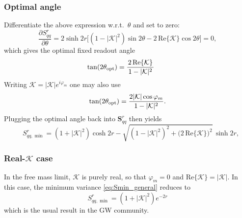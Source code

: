 \subsubsection*{Optimal angle}
Differentiate the above expression w.r.t.~\(\theta\) and set to zero:
\[
\frac{\partial S^{r}_{qq}}{\partial \theta}
= 2\sinh 2r\Big[(1-|\mathcal{K}|^{2})\sin 2\theta - 2\,\mathrm{Re}\{\mathcal{K}\}\cos 2\theta\Big]=0,
\]
which gives the optimal fixed readout angle
\[
\tan(2\theta_{\rm opt})
=  \frac{2\,\mathrm{Re}\{\mathcal{K}\}}{\,1-|\mathcal{K}|^{2}\,}
\qquad
\label{eq:theta_opt}
\]
Writing \(\mathcal{K}=|\mathcal{K}|e^{i\varphi_m}\) one may also use
\[
\tan(2\theta_{\rm opt})=\frac{2|\mathcal{K}|\cos\varphi_m}{\,1-|\mathcal{K}|^{2}\,}.
\]
Plugging the optimal angle back into $\mathbf{S}^{r}_{qq}$ then yields
\[
\quad
S^{r}_{qq,\min}
=(1+|\mathcal{K}|^{2})\cosh 2r - \sqrt{(1-|\mathcal{K}|^{2})^{2}+\big(2\,\mathrm{Re}\{\mathcal{K}\}\big)^{2}}\,\sinh 2r,
\label{eq:Smin_general}
\]

\subsubsection*{Real-\(\mathcal{K}\) case}
In the free mass limit, \(\mathcal{K}\) is purely real, so that \(\varphi_m=0\) and \(\mathrm{Re}\{\mathcal{K}\}=|\mathcal{K}|\). In this case, the minimum variance \eqref{eq:Smin_general} reduces to
\[
S^{r}_{qq,\min}=(1+|\mathcal{K}|^{2})e^{-2r} 
\]
which is the usual result in the GW community.

